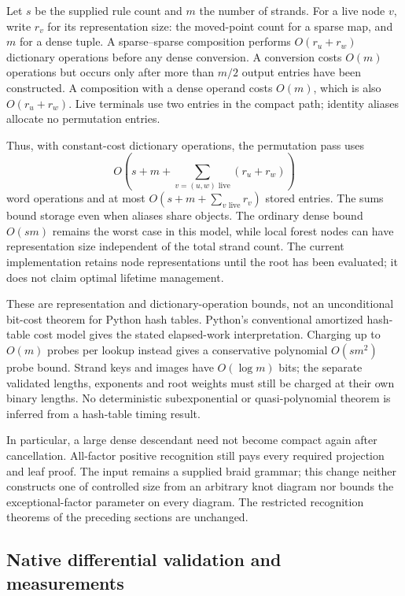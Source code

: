 Let $s$ be the supplied rule count and $m$ the number of strands. For a live
node $v$, write $r_v$ for its representation size: the moved-point count for
a sparse map, and $m$ for a dense tuple. A sparse--sparse composition performs
$O(r_u+r_w)$ dictionary operations before any dense conversion. A conversion
costs $O(m)$ operations but occurs only after more than $m/2$ output entries
have been constructed. A composition with a dense operand costs $O(m)$,
which is also $O(r_u+r_w)$. Live terminals use two entries in the compact path;
identity aliases allocate no permutation entries.

Thus, with constant-cost dictionary operations, the permutation pass uses
\[
 O\!\left(s+m+\sum_{v=(u,w)\text{ live}}(r_u+r_w)\right)
\]
word operations and at most $O(s+m+\sum_{v\text{ live}}r_v)$ stored entries.
The sums bound storage even when aliases share objects. The ordinary dense
bound $O(sm)$ remains the worst case in this model, while local forest nodes
can have representation size independent of the total strand count.
The current implementation retains node representations until the root has
been evaluated; it does not claim optimal lifetime management.

These are representation and dictionary-operation bounds, not an unconditional
bit-cost theorem for Python hash tables. Python's conventional amortized
hash-table cost model gives the stated elapsed-work interpretation. Charging
up to $O(m)$ probes per lookup instead gives a conservative polynomial
$O(sm^2)$ probe bound. Strand keys and images have $O(\log m)$ bits; the
separate validated lengths, exponents and root weights must still be charged
at their own binary lengths. No deterministic subexponential or
quasi-polynomial theorem is inferred from a hash-table timing result.

In particular, a large dense descendant need not become compact again after
cancellation. All-factor positive recognition still pays every required
projection and leaf proof. The input remains a supplied braid grammar; this
change neither constructs one of controlled size from an arbitrary knot
diagram nor bounds the exceptional-factor parameter on every diagram. The
restricted recognition theorems of the preceding sections are unchanged.

\subsection{Native differential validation and measurements}

